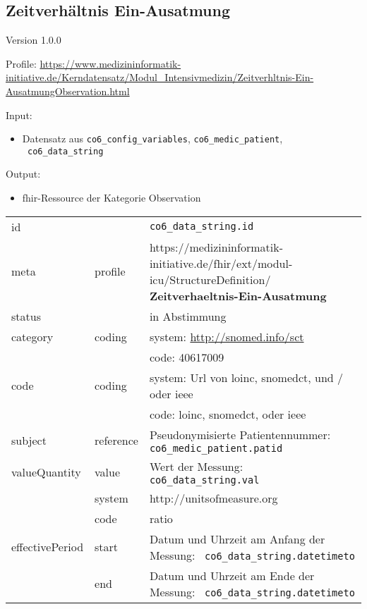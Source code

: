 \subsection{Zeitverhältnis Ein-Ausatmung} 
\noindent Version 1.0.0

\noindent Profile: \url{https://www.medizininformatik-initiative.de/Kerndatensatz/Modul_Intensivmedizin/Zeitverhltnis-Ein-AusatmungObservation.html}

\noindent Input:
\begin{itemize}
	\item Datensatz aus \texttt{co6\_config\_variables}, \texttt{co6\_medic\_patient}, \\ \texttt{
co6\_data\_string}
\end{itemize}
Output:
\begin{itemize}
        \item \ac{fhir}-Ressource der Kategorie \glqq Observation\grqq{}
\end{itemize}
\begin{longtable}{|l|l|p{7.5cm}|}
        \hline
        \rowcolor{lightgray} \multicolumn{3}{|l|}{Data Mapping (inhaltlich)} \\ \hline
        id &  & \texttt{co6\_data\_string.id} \\ \hline
	meta & profile & https://medizininformatik-initiative.de/fhir/ext/modul-icu/StructureDefinition/\textbf{
Zeitverhaeltnis-Ein-Ausatmung} \\ \hline 
	status &  & in Abstimmung  \\ \hline 
	category & coding & system: \url{http://snomed.info/sct} \\
\cline{3-3}
	& & code: 40617009 \\ \hline
	code & coding & system: Url von \ac{loinc}, \ac{snomedct}, und / oder \ac{ieee} \\ 
	\cline{3-3} 
	 &  & code: \ac{loinc}, \ac{snomedct}, oder \ac{ieee} \\ \hline
	subject & reference & Pseudonymisierte Patientennummer: \texttt{co6\_medic\_patient.patid} \\ \hline
	valueQuantity & value & Wert der Messung: \texttt{
co6\_data\_string.val} \\
        \cline{2-3}
         & system & http://unitsofmeasure.org \\
         \cline{2-3}
         & code & {ratio} \\ \hline
    effectivePeriod & start & Datum und Uhrzeit am Anfang der Messung: \texttt{
co6\_data\_string.datetimeto} \\
    \cline{2-3}
     & end & Datum und Uhrzeit am Ende der Messung: \texttt{
co6\_data\_string.datetimeto} \\ \hline
\end{longtable}
\clearpage

